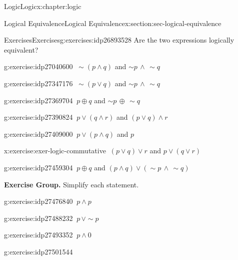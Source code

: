 \documentclass[twoside,10pt,]{book}
\numberwithin{equation}{section}
\begin{document}
\begin{chapterptx}{Logic}{}{Logic}{}{}{x:chapter:logic}
\begin{sectionptx}{Logical Equivalence}{}{Logical Equivalence}{}{}{x:section:sec-logical-equivalence}
\begin{exercises-subsection}{Exercises}{}{Exercises}{}{}{g:exercises:idp26893528}
Are the two expressions logically equivalent?\begin{exercisegroup}
\begin{divisionexerciseeg}{11}{}{}{g:exercise:idp27040600}%
\(\ \sim\!(p{\wedge} q)\) and \(\sim\!{p}\,{\wedge}\,\sim\!{q}\)\end{divisionexerciseeg}%
\begin{divisionexerciseeg}{12}{}{}{g:exercise:idp27347176}%
\(\ \sim\!(p{\vee} q)\) and \(\sim\!{p}\,{\wedge}\,\sim\!{q}\)\end{divisionexerciseeg}%
\begin{divisionexerciseeg}{13}{}{}{g:exercise:idp27369704}%
\(\ p{\oplus} q\) and \(\sim\!{p}\,{\oplus}\,\sim\!{q}\)\end{divisionexerciseeg}%
\begin{divisionexerciseeg}{14}{}{}{g:exercise:idp27390824}%
\(\ p{\vee}(q{\wedge} r)\) and \((p{\vee} q){\wedge} r\)\end{divisionexerciseeg}%
\begin{divisionexerciseeg}{15}{}{}{g:exercise:idp27409000}%
\(\ p{\vee}(p{\wedge} q)\) and \(p\)\end{divisionexerciseeg}%
\begin{divisionexerciseeg}{16}{}{}{x:exercise:exer-logic-commutative}%
\(\ (p{\vee} q){\vee} r\) and \(p{\vee} (q{\vee} r)\)\end{divisionexerciseeg}%
\begin{divisionexerciseeg}{17}{}{}{g:exercise:idp27459304}%
\(\ p{\oplus} q\) and \((p{\wedge} q){\vee} (\sim\!{p}\,{\wedge}\,\sim\!{q})\)\end{divisionexerciseeg}%
\end{exercisegroup}
\par\medskip\noindent
\par\medskip\noindent%
\textbf{Exercise Group.}\space\space%
Simplify each statement.\begin{exercisegroup}
\begin{divisionexerciseeg}{18}{}{}{g:exercise:idp27476840}%
\(\ p{\wedge} p\)\end{divisionexerciseeg}%
\begin{divisionexerciseeg}{19}{}{}{g:exercise:idp27488232}%
\(\ p\,{\vee}\sim\!{p}\)\end{divisionexerciseeg}%
\begin{divisionexerciseeg}{20}{}{}{g:exercise:idp27493352}%
\(\ p{\wedge} 0\)\end{divisionexerciseeg}%
\begin{divisionexerciseeg}{21}{}{}{g:exercise:idp27501544}%

\end{divisionexerciseeg}
\end{exercisegroup}
\end{exercises-subsection}
\end{sectionptx}
\end{chapterptx}
\end{document}
